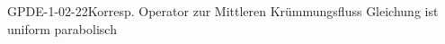 
\begin{EXA}{GPDE-1-02-22}{Korresp. Operator zur Mittleren Krümmungsfluss Gleichung ist uniform parabolisch}
\end{EXA}
